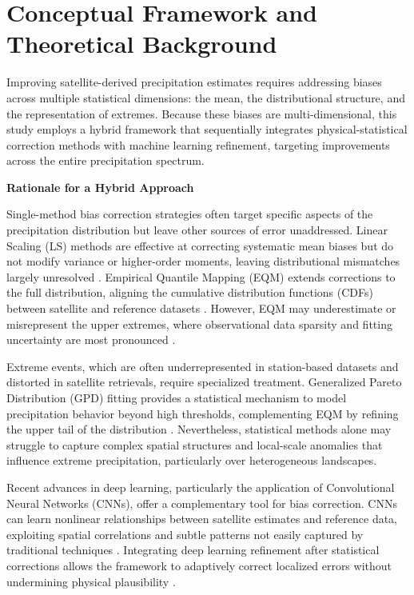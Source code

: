 \documentclass[11pt,a4paper]{article}
\begin{document}
\section{Conceptual Framework and Theoretical Background}

Improving satellite-derived precipitation estimates requires addressing
biases across multiple statistical dimensions: the mean, the
distributional structure, and the representation of extremes. Because
these biases are multi-dimensional, this study employs a hybrid
framework that sequentially integrates physical-statistical correction
methods with machine learning refinement, targeting improvements across
the entire precipitation spectrum.

\textbf{Rationale for a Hybrid Approach}

Single-method bias correction strategies often target specific aspects
of the precipitation distribution but leave other sources of error
unaddressed. Linear Scaling (LS) methods are effective at correcting
systematic mean biases but do not modify variance or higher-order
moments, leaving distributional mismatches largely unresolved
\cite{ref4,ref16}. Empirical Quantile Mapping (EQM) extends corrections to the
full distribution, aligning the cumulative distribution functions (CDFs)
between satellite and reference datasets \cite{ref5,ref6}. However, EQM may
underestimate or misrepresent the upper extremes, where observational
data sparsity and fitting uncertainty are most pronounced \cite{ref8}.

Extreme events, which are often underrepresented in station-based
datasets and distorted in satellite retrievals, require specialized
treatment. Generalized Pareto Distribution (GPD) fitting provides a
statistical mechanism to model precipitation behavior beyond high
thresholds, complementing EQM by refining the upper tail of the
distribution \cite{ref7}. Nevertheless, statistical methods alone may
struggle to capture complex spatial structures and local-scale anomalies
that influence extreme precipitation, particularly over heterogeneous
landscapes.

Recent advances in deep learning, particularly the application of
Convolutional Neural Networks (CNNs), offer a complementary tool for
bias correction. CNNs can learn nonlinear relationships between
satellite estimates and reference data, exploiting spatial correlations
and subtle patterns not easily captured by traditional techniques
\cite{ref9,ref17}. Integrating deep learning refinement after statistical
corrections allows the framework to adaptively correct localized errors
without undermining physical plausibility \cite{ref10}.
\end{document}
